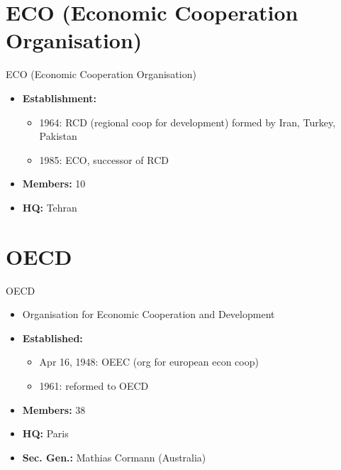 \documentclass[
  12pt,
  ignorenonframetext,
  progressbar=frametitle]{beamer}
\providecommand{\tightlist}{%
  \setlength{\itemsep}{0pt}\setlength{\parskip}{0pt}}
\begin{document}
\section{ECO (Economic Cooperation Organisation)}
\begin{frame}[allowframebreaks]
{ECO (Economic Cooperation Organisation)}
\protect\hypertarget{eco-economic-cooperation-organisation}{}
\begin{itemize}
\tightlist
\item
  \textbf{Establishment:}

  \begin{itemize}
  \tightlist
  \item
    1964: RCD (regional coop for development) formed by Iran, Turkey,
    Pakistan
  \item
    1985: ECO, successor of RCD
  \end{itemize}
\item
  \textbf{Members:} 10
\item
  \textbf{HQ:} Tehran
\end{itemize}
\end{frame}

\section{OECD}
\begin{frame}[allowframebreaks]
{OECD}
\protect\hypertarget{oecd}{}
\begin{itemize}
\tightlist
\item
  Organisation for Economic Cooperation and Development
\item
  \textbf{Established:}

  \begin{itemize}
  \tightlist
  \item
    Apr 16, 1948: OEEC (org for european econ coop)
  \item
    1961: reformed to OECD
  \end{itemize}
\item
  \textbf{Members:} 38
\item
  \textbf{HQ:} Paris
\item
  \textbf{Sec. Gen.:} Mathias Cormann (Australia)
\end{itemize}
\end{frame}
\end{document}

